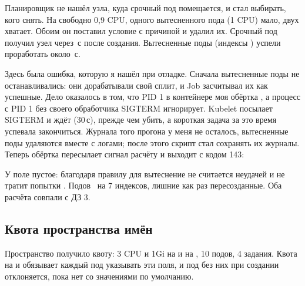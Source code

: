 
Планировщик не нашёл узла, куда срочный под помещается, и стал выбирать, кого снять. На \mono{\preemptNode} свободно 0,9 CPU, одного вытесненного пода (1 CPU) мало, двух хватает. Обоим он поставил условие  с причиной  и удалил их. Срочный под получил узел через \urgentPending\,с после создания. Вытесненные поды (индексы \preemptedIdx) успели проработать около \preemptedRan\,с.

Здесь была ошибка, которую я нашёл при отладке. Сначала вытесненные поды не останавливались: они дорабатывали свой сплит, и Job засчитывал их как успешные. Дело оказалось в том, что PID 1 в контейнере моя обёртка , а процесс с PID 1 без своего обработчика SIGTERM игнорирует. Kubelet посылает SIGTERM и ждёт  (30\,с), прежде чем убить, а короткая задача за это время успевала закончиться. Журнала того прогона у меня не осталось, вытесненные поды удаляются вместе с логами; после этого скрипт стал сохранять их журналы. Теперь обёртка пересылает сигнал расчёту и выходит с кодом 143:




У  поле  пустое: благодаря правилу  для  вытеснение не считается неудачей и не тратит попытки . Подов \lowPods\ на 7 индексов, лишние как раз пересозданные. Оба расчёта совпали с ДЗ 3.

\subsection{Квота пространства имён}
Пространство  получило квоту: 3 CPU и 1Gi на  и на , 10 подов, 4 задания. Квота на  и  обязывает каждый под указывать эти поля, и под без них при создании отклоняется, пока нет  со значениями по умолчанию.


